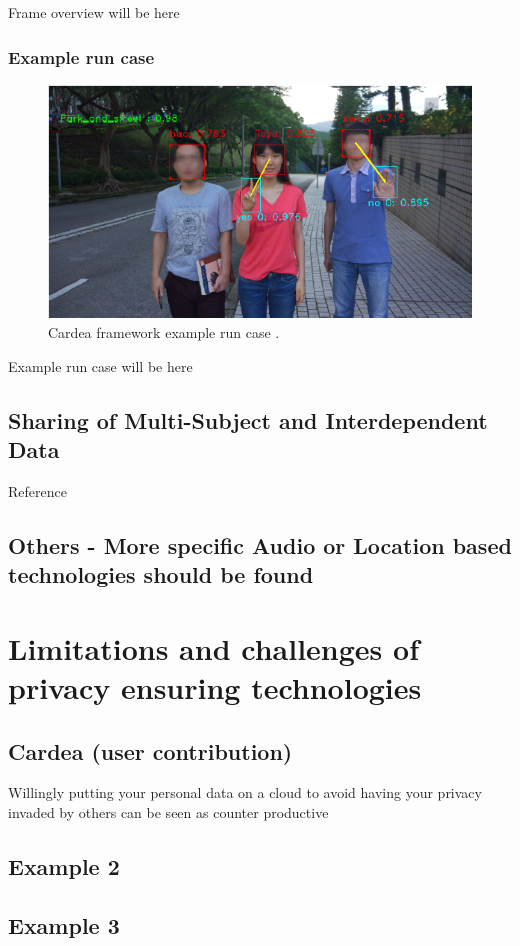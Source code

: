 \documentclass[conference]{IEEEtran}
\begin{document}
Frame overview will be here 



\subsubsection{Example run case}
\begin{figure}[t]
\centerline{\includegraphics[width=.5\textwidth]{img/cardea_example.png}}
\caption{Cardea framework example run case \cite{shu2016cardea}.}
\label{fig:cardea}
\end{figure}

Example run case will be here 



\subsection{Sharing of Multi-Subject and Interdependent Data}
Reference \cite{olteanu2018consensual}


\subsection{Others - More specific Audio or Location based technologies should be found}


\section{Limitations and challenges of privacy ensuring technologies}\label{Limitations}
\subsection{Cardea (user contribution)}
Willingly putting your personal data on a cloud to avoid having your privacy invaded by others can be seen as counter productive
\subsection{Example 2}
\subsection{Example 3}
\end{document}
